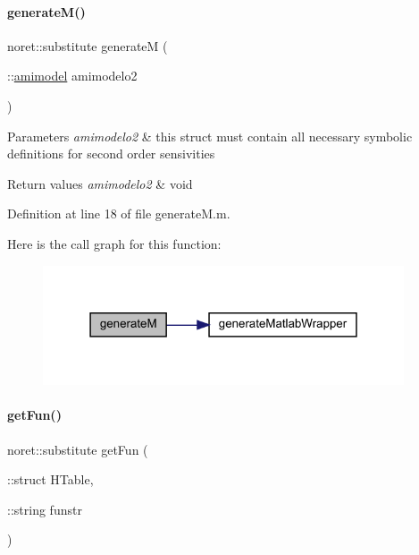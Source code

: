\paragraph{\texorpdfstring{generate\+M()}{generateM()}}
{\footnotesize\ttfamily noret\+::substitute generateM (\begin{DoxyParamCaption}\item[{\+::\mbox{\hyperlink{classamimodel}{amimodel}}}]{amimodelo2 }\end{DoxyParamCaption})}


\begin{DoxyParams}{Parameters}
{\em amimodelo2} & this struct must contain all necessary symbolic definitions for second order sensivities\\
\hline
\end{DoxyParams}

\begin{DoxyRetVals}{Return values}
{\em amimodelo2} & void \\
\hline
\end{DoxyRetVals}


Definition at line 18 of file generate\+M.\+m.

Here is the call graph for this function\+:
\nopagebreak
\begin{figure}[H]
\begin{center}
\leavevmode
\includegraphics[width=303pt]{classamimodel_a6e93ea24824d9d90c322960e6d78fed0_cgraph}
\end{center}
\end{figure}
\mbox{\label{classamimodel_a08d58ae650e5ff9310760f6d3f08015c}} 
\paragraph{\texorpdfstring{get\+Fun()}{getFun()}}
{\footnotesize\ttfamily noret\+::substitute get\+Fun (\begin{DoxyParamCaption}\item[{\+::struct}]{H\+Table,  }\item[{\+::string}]{funstr }\end{DoxyParamCaption})}


